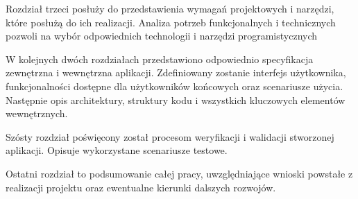 Rozdział trzeci posłuży do przedstawienia wymagań projektowych i narzędzi, które posłużą do ich realizacji. Analiza potrzeb funkcjonalnych i technicznych pozwoli na wybór odpowiednich technologii i narzędzi programistycznych

W kolejnych dwóch rozdziałach przedstawiono odpowiednio specyfikacja zewnętrzna i wewnętrzna aplikacji. Zdefiniowany zostanie interfejs użytkownika, funkcjonalności dostępne dla użytkowników końcowych oraz scenariusze użycia. Następnie opis architektury, struktury kodu i wszystkich kluczowych elementów wewnętrznych. 

Szósty rozdział poświęcony został procesom weryfikacji i walidacji stworzonej aplikacji. Opisuje wykorzystane scenariusze testowe.

Ostatni rozdział to podsumowanie całej pracy, uwzględniające wnioski powstałe z realizacji projektu oraz ewentualne kierunki dalszych rozwojów.
